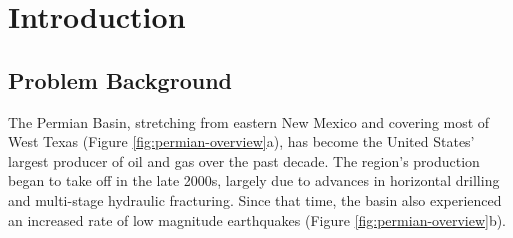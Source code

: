 
\chapter{Introduction}


\section{Problem Background}
\label{sec:chap1-problem}




The Permian Basin, stretching from eastern New Mexico and covering most of West Texas (Figure \ref{fig:permian-overview}a), has become the United States' largest producer of oil and gas over the past decade. The region's production began to take off in the late 2000s, largely due to advances in horizontal drilling and multi-stage hydraulic fracturing.
Since that time, the basin also experienced an increased rate of low magnitude earthquakes \citep{Frohlich2016HistoricalReviewInduced, Atkinson2016HydraulicFracturingSeismicity, Frohlich2019OnsetCauseIncreased, Lomax2019ImprovingAbsoluteEarthquake, Savvaidis2020InducedSeismicityDelaware, Skoumal2020InducedSeismicityDelaware} (Figure \ref{fig:permian-overview}b).


